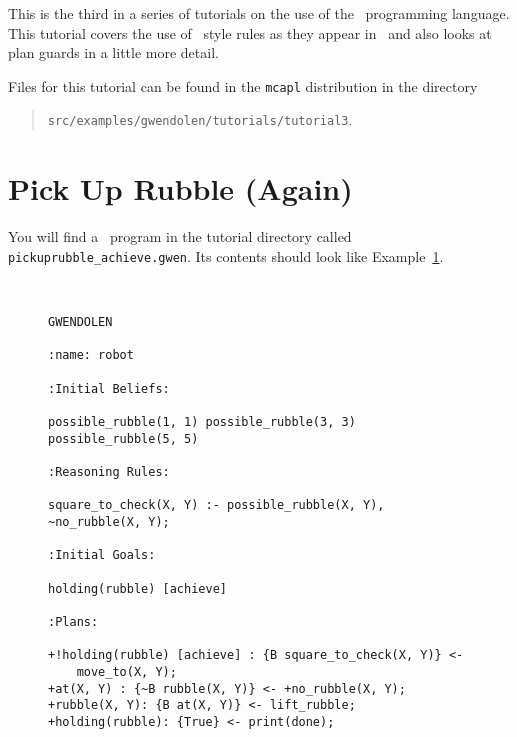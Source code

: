 \label{tutorial:gwendolen:guards}
This is the third in a series of tutorials on the use of the
\gwendolen\ programming language.  This tutorial covers the use of
\prolog\ style rules as they appear in \gwendolen\ and also looks at
plan guards in a little more
detail. 

Files for this tutorial can be found in the \texttt{mcapl}
distribution in the directory  
\begin{quote}
\texttt{src/examples/gwendolen/tutorials/tutorial3}.
\end{quote}

\section{Pick Up Rubble (Again)}

\begin{sloppypar}
You will find a \gwendolen\ program in the tutorial directory called
\texttt{pickuprubble\_achieve.gwen}.  Its contents should look like
Example~\ref{code:pickuprubble_achieve_tut3}. 
\end{sloppypar}
\begin{figure}[htb]
\begin{ourexample}
\label{code:pickuprubble_achieve_tut3} \quad \\
\begin{lstlisting}[basicstyle=\sffamily,style=easslisting,language=Gwendolen]
GWENDOLEN

:name: robot

:Initial Beliefs:

possible_rubble(1, 1) possible_rubble(3, 3) possible_rubble(5, 5)

:Reasoning Rules:

square_to_check(X, Y) :- possible_rubble(X, Y), ~no_rubble(X, Y);

:Initial Goals:

holding(rubble) [achieve]

:Plans:

+!holding(rubble) [achieve] : {B square_to_check(X, Y)} <- 
    move_to(X, Y);
+at(X, Y) : {~B rubble(X, Y)} <- +no_rubble(X, Y);
+rubble(X, Y): {B at(X, Y)} <- lift_rubble;
+holding(rubble): {True} <- print(done);
\end{lstlisting}
\end{ourexample}
\end{figure}

